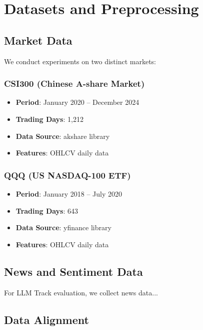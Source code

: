 
\section{Datasets and Preprocessing}

\subsection{Market Data}

We conduct experiments on two distinct markets:

\subsubsection{CSI300 (Chinese A-share Market)}

\begin{itemize}
    \item \textbf{Period}: January 2020 -- December 2024
    \item \textbf{Trading Days}: 1,212
    \item \textbf{Data Source}: akshare library
    \item \textbf{Features}: OHLCV daily data
\end{itemize}

\subsubsection{QQQ (US NASDAQ-100 ETF)}

\begin{itemize}
    \item \textbf{Period}: January 2018 -- July 2020
    \item \textbf{Trading Days}: 643
    \item \textbf{Data Source}: yfinance library
    \item \textbf{Features}: OHLCV daily data
\end{itemize}

\subsection{News and Sentiment Data}

For LLM Track evaluation, we collect news data...

\subsection{Data Alignment}

